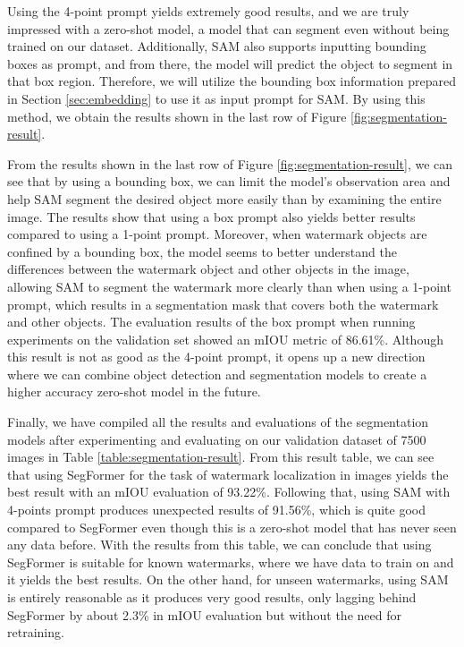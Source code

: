 Using the 4-point prompt yields extremely good results, and we are truly impressed with a zero-shot model, a model that can segment even without being trained on our dataset. Additionally, SAM also supports inputting bounding boxes as prompt, and from there, the model will predict the object to segment in that box region. Therefore, we will utilize the bounding box information prepared in Section \ref{sec:embedding} to use it as input prompt for SAM. By using this method, we obtain the results shown in the last row of Figure \ref{fig:segmentation-result}.

From the results shown in the last row of Figure \ref{fig:segmentation-result}, we can see that by using a bounding box, we can limit the model's observation area and help SAM segment the desired object more easily than by examining the entire image. The results show that using a box prompt also yields better results compared to using a 1-point prompt. Moreover, when watermark objects are confined by a bounding box, the model seems to better understand the differences between the watermark object and other objects in the image, allowing SAM to segment the watermark more clearly than when using a 1-point prompt, which results in a segmentation mask that covers both the watermark and other objects. The evaluation results of the box prompt when running experiments on the validation set showed an mIOU metric of 86.61\%. Although this result is not as good as the 4-point prompt, it opens up a new direction where we can combine object detection and segmentation models to create a higher accuracy zero-shot model in the future.

Finally, we have compiled all the results and evaluations of the segmentation models after experimenting and evaluating on our validation dataset of 7500 images in Table \ref{table:segmentation-result}. From this result table, we can see that using SegFormer for the task of watermark localization in images yields the best result with an mIOU evaluation of 93.22\%. Following that, using SAM with 4-points prompt produces unexpected results of 91.56\%, which is quite good compared to SegFormer even though this is a zero-shot model that has never seen any data before. With the results from this table, we can conclude that using SegFormer is suitable for known watermarks, where we have data to train on and it yields the best results. On the other hand, for unseen watermarks, using SAM is entirely reasonable as it produces very good results, only lagging behind SegFormer by about 2.3\% in mIOU evaluation but without the need for retraining.

